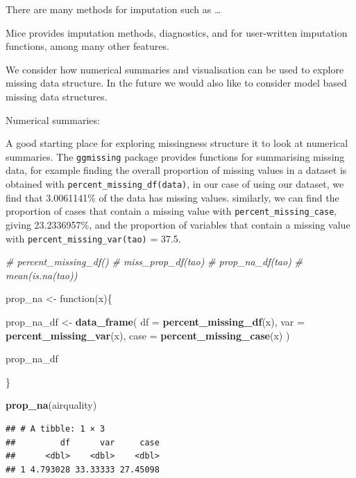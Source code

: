 \documentclass[]{article}
\newenvironment{Shaded}{\begin{snugshade}}{\end{snugshade}}
\newcommand{\KeywordTok}[1]{\textcolor[rgb]{0.13,0.29,0.53}{\textbf{{#1}}}}
\newcommand{\DataTypeTok}[1]{\textcolor[rgb]{0.13,0.29,0.53}{{#1}}}
\newcommand{\DecValTok}[1]{\textcolor[rgb]{0.00,0.00,0.81}{{#1}}}
\newcommand{\StringTok}[1]{\textcolor[rgb]{0.31,0.60,0.02}{{#1}}}
\newcommand{\CommentTok}[1]{\textcolor[rgb]{0.56,0.35,0.01}{\textit{{#1}}}}
\newcommand{\NormalTok}[1]{{#1}}
\begin{document}
There are many methods for imputation such as \ldots{}

Mice provides imputation methods, diagnostics, and for user-written
imputation functions, among many other features.

We consider how numerical summaries and visualisation can be used to
explore missing data structure. In the future we would also like to
consider model based missing data structures.

Numerical summaries:

A good starting place for exploring missingness structure it to look at
numerical summaries. The \texttt{ggmissing} package provides functions
for summarising missing data, for example finding the overall proportion
of missing values in a dataset is obtained with
\texttt{percent\_missing\_df(data)}, in our case of using our dataset,
we find that 3.0061141\% of the data has missing values. similarly, we
can find the proportion of cases that contain a missing value with
\texttt{percent\_missing\_case}, giving 23.2336957\%, and the proportion
of variables that contain a missing value with
\texttt{percent\_missing\_var(tao)} = 37.5.

\begin{Shaded}
\begin{Highlighting}[]
\CommentTok{# percent_missing_df()}
\CommentTok{# miss_prop_df(tao)}
\CommentTok{# prop_na_df(tao)}
\CommentTok{# mean(is.na(tao))}

\NormalTok{prop_na <-}\StringTok{ }\NormalTok{function(x)\{}
  
  \NormalTok{prop_na_df <-}\StringTok{ }\KeywordTok{data_frame}\NormalTok{(}
    \DataTypeTok{df =} \KeywordTok{percent_missing_df}\NormalTok{(x),}
    \DataTypeTok{var =} \KeywordTok{percent_missing_var}\NormalTok{(x),}
    \DataTypeTok{case =} \KeywordTok{percent_missing_case}\NormalTok{(x)}
  \NormalTok{)}
  
  \NormalTok{prop_na_df}
  
\NormalTok{\}}

\KeywordTok{prop_na}\NormalTok{(airquality)}
\end{Highlighting}
\end{Shaded}

\begin{verbatim}
## # A tibble: 1 × 3
##         df      var     case
##      <dbl>    <dbl>    <dbl>
## 1 4.793028 33.33333 27.45098
\end{verbatim}

\begin{Shaded}
\end{Shaded}
\end{document}
